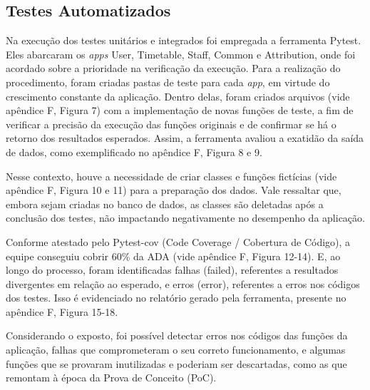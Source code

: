 \documentclass[12pt]{article}
\begin{document}
\subsection{Testes Automatizados}
\par Na execução dos testes unitários e integrados foi empregada a ferramenta Pytest. Eles abarcaram os \textit{apps} User, Timetable, Staff, Common e Attribution, onde foi acordado sobre a prioridade na verificação da execução. Para a realização do procedimento, foram criadas pastas de teste para cada \textit{app}, em virtude do crescimento constante da aplicação. Dentro delas, foram criados arquivos (vide apêndice F, Figura 7) com a implementação de novas funções de teste, a fim de verificar a precisão da execução das funções originais e de confirmar se há o retorno dos resultados esperados. Assim, a ferramenta avaliou a exatidão da saída de dados, como exemplificado no apêndice F, Figura 8 e 9.
\par Nesse contexto, houve a necessidade de criar  classes e funções fictícias (vide apêndice F, Figura 10 e 11) para a preparação dos dados. Vale ressaltar que, embora sejam criadas no banco de dados, as classes são deletadas após a conclusão dos testes, não impactando negativamente no desempenho da aplicação.
\par Conforme atestado pelo Pytest-cov (Code Coverage / Cobertura de Código), a equipe conseguiu cobrir 60\% da ADA (vide apêndice F, Figura 12-14). E, ao longo do processo, foram identificadas falhas (failed), referentes a resultados divergentes em relação ao esperado, e erros (error), referentes a erros nos códigos dos testes. Isso é evidenciado no relatório gerado pela ferramenta, presente no apêndice F, Figura 15-18.
\par Considerando o exposto, foi possível detectar erros nos códigos das funções da aplicação, falhas que comprometeram o seu correto funcionamento, e algumas funções que se provaram inutilizadas e poderiam ser descartadas, como as que remontam à época da Prova de Conceito (PoC).
\end{document}
